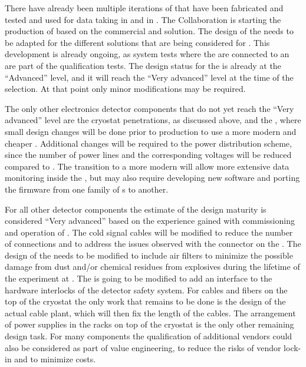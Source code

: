 There have already been multiple iterations of  that
have been fabricated and tested and used for data taking in 
 and in . The  Collaboration
is starting the production of  based on the commercial  and
 solution. The design of the  needs to be adapted
for the different  solutions that are being considered
for . This development is already ongoing, as system tests 
where the  are connected to an  are part
of the qualification tests. The design status for the 
is already at the ``Advanced'' level, and it will reach the 
``Very advanced'' level at the time of the 
selection. At that point only minor modifications may be
required. 

The only other  electronics detector components that do not yet
reach the ``Very advanced'' level are the cryostat penetrations, as
discussed above, and the , where small
design changes will be done prior to production to use a more
modern and cheaper . Additional changes will be required to
the power distribution scheme, since the number of power lines
and the corresponding voltages will be reduced compared to
. The transition to a more modern  will allow 
more extensive data monitoring inside the , but may
also require developing new software and porting the firmware
from one family of s to another. 

For all other detector components the estimate of the design
maturity is considered ``Very advanced'' based on the experience
gained with commissioning and operation of . The 
cold signal cables will be modified to reduce the number of
connections and to address the issues observed with the connector
on the . The design of the  needs to
be modified to include air filters to minimize the possible
damage from dust and/or chemical residues from  explosives 
during the lifetime of the experiment at .
The  is going to be modified to add an interface to
the hardware interlocks of the detector safety system. For
cables and fibers on the top of the cryostat the only work that
remains to be done is the design of the actual cable plant, 
which will then fix the length of the cables. The arrangement
of power supplies in the racks on top of the cryostat is the
only other remaining design task. For many components the
qualification of additional vendors could also be considered
as part of value engineering, to reduce the risks of vendor
lock-in and to minimize costs. 

